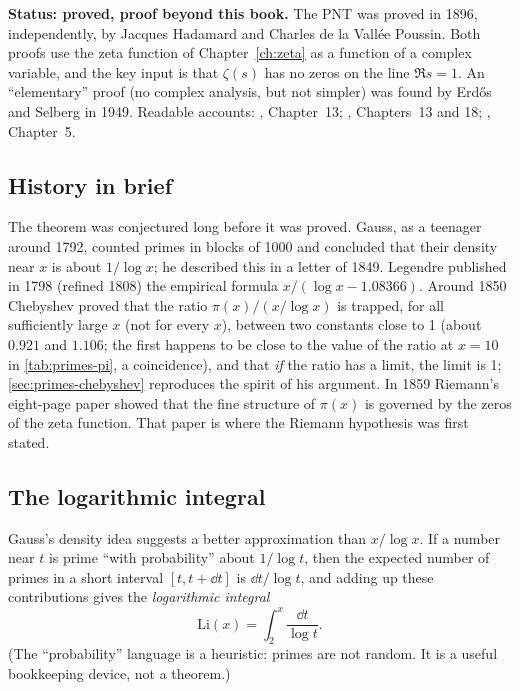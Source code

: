 \begin{beyond}
\textbf{Status: proved, proof beyond this book.} The PNT was proved in 1896, independently, by Jacques Hadamard and Charles de la Vall\'ee Poussin. Both proofs use the zeta function of Chapter~\ref{ch:zeta} as a function of a complex variable, and the key input is that $\zeta(s)$ has no zeros on the line $\Re s=1$. An ``elementary'' proof (no complex analysis, but not simpler) was found by Erd\H{o}s and Selberg in 1949. Readable accounts: \cite{apostol}, Chapter~13; \cite{davenport}, Chapters~13 and 18; \cite{edwards}, Chapter~5.
\end{beyond}

\subsection{History in brief}

The theorem was conjectured long before it was proved. Gauss, as a teenager around 1792, counted primes in blocks of 1000 and concluded that their density near $x$ is about $1/\log x$; he described this in a letter of 1849. Legendre published in 1798 (refined 1808) the empirical formula $x/(\log x-1.08366)$. Around 1850 Chebyshev proved that the ratio $\pi(x)/(x/\log x)$ is trapped, for all sufficiently large $x$ (not for every $x$), between two constants close to 1 (about $0.921$ and $1.106$; the first happens to be close to the value of the ratio at $x=10$ in \cref{tab:primes-pi}, a coincidence), and that \emph{if} the ratio has a limit, the limit is 1; \cref{sec:primes-chebyshev} reproduces the spirit of his argument. In 1859 Riemann's eight-page paper \cite{riemann1859} showed that the fine structure of $\pi(x)$ is governed by the zeros of the zeta function. That paper is where the Riemann hypothesis was first stated.

\subsection{The logarithmic integral}

Gauss's density idea suggests a better approximation than $x/\log x$. If a number near $t$ is prime ``with probability'' about $1/\log t$, then the expected number of primes in a short interval $[t,t+\dd t]$ is $\dd t/\log t$, and adding up these contributions gives the \emph{logarithmic integral}
\begin{equation}
\mathrm{Li}(x) = \int_2^x\frac{\dd t}{\log t}.
\label{eq:primes-Li}
\end{equation}
(The ``probability'' language is a heuristic: primes are not random. It is a useful bookkeeping device, not a theorem.)

